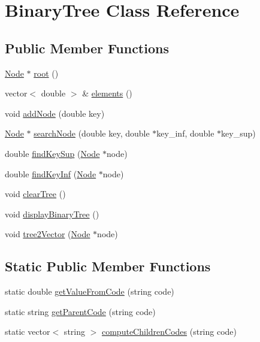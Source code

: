 \hypertarget{class_binary_tree}{}\section{Binary\+Tree Class Reference}
\label{class_binary_tree}
\subsection*{Public Member Functions}
\begin{DoxyCompactItemize}
\item 
\hyperlink{class_node}{Node} $\ast$ \hyperlink{class_binary_tree_ad71614bd643e7332db81910d4ec60ae4}{root} ()
\item 
vector$<$ double $>$ \& \hyperlink{class_binary_tree_a05dcc405dda599720c53173a2b91950c}{elements} ()
\item 
void \hyperlink{class_binary_tree_acadad9eac7d01a58883cac091d43ecb1}{add\+Node} (double key)
\item 
\hyperlink{class_node}{Node} $\ast$ \hyperlink{class_binary_tree_a58a87a968d39dbe74e9c9363ce0eb437}{search\+Node} (double key, double $\ast$key\+\_\+inf, double $\ast$key\+\_\+sup)
\item 
double \hyperlink{class_binary_tree_a6f2cf79a3f783f0e7f5038b05590824d}{find\+Key\+Sup} (\hyperlink{class_node}{Node} $\ast$node)
\item 
double \hyperlink{class_binary_tree_af98cceb11a019b25437bdc952891de4b}{find\+Key\+Inf} (\hyperlink{class_node}{Node} $\ast$node)
\item 
void \hyperlink{class_binary_tree_a333191ebfa0b1b1582ed64e0640e66be}{clear\+Tree} ()
\item 
void \hyperlink{class_binary_tree_a2765aa4e333ecae187f420b0c81419cc}{display\+Binary\+Tree} ()
\item 
void \hyperlink{class_binary_tree_a0d94d543c5ac2de53e63a715e7023ed4}{tree2\+Vector} (\hyperlink{class_node}{Node} $\ast$node)
\end{DoxyCompactItemize}
\subsection*{Static Public Member Functions}
\begin{DoxyCompactItemize}
\item 
static double \hyperlink{class_binary_tree_a9c0dbb687bd2cd3515f36be892b9df62}{get\+Value\+From\+Code} (string code)
\item 
static string \hyperlink{class_binary_tree_ae165081b697a3ac47e0ad19fd54df2b7}{get\+Parent\+Code} (string code)
\item 
static vector$<$ string $>$ \hyperlink{class_binary_tree_afd572418d14f2fd6963118d0324b2b99}{compute\+Children\+Codes} (string code)
\end{DoxyCompactItemize}


